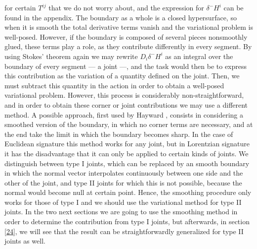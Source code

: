 \documentclass[11pt,letterpaper]{article}
\newcommand{\dslash}{\delta^{\!\!\!\!-}\!}
\begin{document}
for certain $T^{ij}$ that we do not worry about, and the expression for $\dslash H^i$ can be found in the appendix. The boundary as a whole is a closed hypersurface, so when it is smooth the total derivative terms vanish and the variational problem is well-posed. However, if the boundary is composed of several pieces nonsmoothly glued, these terms play a role, as they contribute differently in every segment. By using Stokes' theorem again we may rewrite $D_i \dslash H^i$ as an integral over the boundary of every segment --- a joint ---, and the task would then be to express this contribution as the variation of a quantity defined on the joint. Then, we must subtract this quantity in the action in order to obtain a well-posed variational problem. However, this process is considerably non-straightforward, and in order to obtain these corner or joint contributions we may use a different method. A possible approach, first used by Hayward \cite{Hayward:1993my}, consists in considering a smoothed version of the boundary, in which no corner terms are necessary, and at the end take the limit in which the boundary becomes sharp. In the case of Euclidean signature this method works for any joint, but in Lorentzian signature it has the disadvantage that it can only be applied to certain kinds of joints.  We distinguish between type I joints, which can be replaced by an smooth boundary in which the normal vector interpolates continuously between one side and the other of the joint, and type II joints for which this is not possible, because the normal would become null at certain point. Hence, the smoothing procedure only works for those of type I and we should use the variational method for type II joints. In the two next sections we are going to use the smoothing method in order to determine the contribution from type I joints, but afterwards, in section \ref{24}, we will see that the result can be straightforwardly generalized for type II joints as well.

\end{document}
